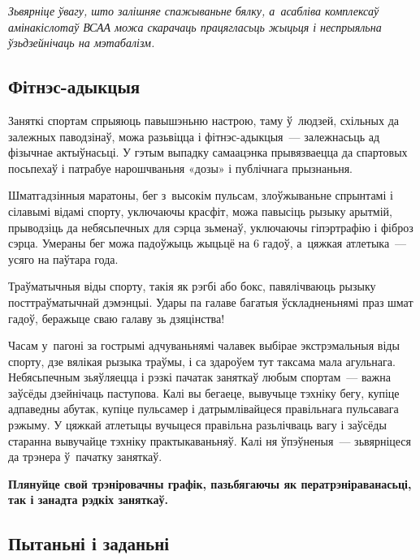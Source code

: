\emph{Зьвярніце ўвагу, што залішняе спажываньне бялку, а~асабліва комплексаў амінакіслотаў ВСАА можа скарачаць працягласьць жыцьця і неспрыяльна ўзьдзейнічаць на мэтабалізм.}

\subsection*{Фітнэс-адыкцыя}

Заняткі спортам спрыяюць павышэньню настрою, таму ў~людзей, схільных да залежных паводзінаў, можа разьвіцца і фітнэс-адыкцыя~--- залежнасьць ад фізычнае актыўнасьці. У гэтым выпадку самаацэнка прывязваецца да спартовых посьпехаў і патрабуе нарошчваньня «дозы» і публічнага прызнаньня. 


Шматгадзінныя маратоны, бег з~высокім пульсам, злоўжываньне спрынтамі і сілавымі відамі спорту, уключаючы красфіт, можа павысіць рызыку арытмій, прыводзіць да небясьпечных для сэрца зьменаў, уключаючы гіпэртрафію і фіброз сэрца. Умераны бег можа падоўжыць жыцьцё на 6 гадоў, а~цяжкая атлетыка~--- усяго на паўтара года. 

Траўматычныя віды спорту, такія як рэгбі або бокс, павялічваюць рызыку посттраўматычнай дэмэнцыі. Удары па галаве багатыя ўскладненьнямі праз шмат гадоў, беражыце сваю галаву зь дзяцінства!

Часам у~пагоні за гострымі адчуваньнямі чалавек выбірае экстрэмальныя віды спорту, дзе вялікая рызыка траўмы, і са здароўем тут таксама мала агульнага. Небясьпечным зьяўляецца і рэзкі пачатак заняткаў любым спортам~--- важна заўсёды дзейнічаць паступова. Калі вы бегаеце, вывучыце тэхніку бегу, купіце адпаведны абутак, купіце пульсамер і датрымлівайцеся правільнага пульсавага рэжыму. У цяжкай атлетыцы вучыцеся правільна разьлічваць вагу і заўсёды старанна вывучайце тэхніку практыкаваньняў. Калі ня ўпэўненыя~--- зьвярніцеся да трэнера ў~пачатку заняткаў.

\textbf{Плянуйце свой трэніровачны графік, пазьбягаючы як ператрэніраванасьці, так і занадта рэдкіх заняткаў.}

\subsection*{Пытаньні і заданьні}

